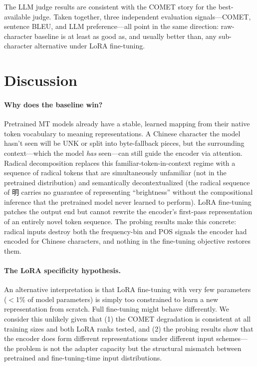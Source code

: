 \documentclass[11pt]{article}
\begin{document}
The LLM judge results are consistent with the COMET story for the best-available judge. Taken together, three independent evaluation signals---COMET, sentence BLEU, and LLM preference---all point in the same direction: raw-character baseline is at least as good as, and usually better than, any sub-character alternative under LoRA fine-tuning.

\section{Discussion}
\label{sec:discussion}

\paragraph{Why does the baseline win?}
Pretrained MT models already have a stable, learned mapping from their native token vocabulary to meaning representations. A Chinese character the model hasn't seen will be UNK or split into byte-fallback pieces, but the surrounding context---which the model \textit{has} seen---can still guide the encoder via attention. Radical decomposition replaces this familiar-token-in-context regime with a sequence of radical tokens that are simultaneously unfamiliar (not in the pretrained distribution) and semantically decontextualized (the radical sequence of 明 carries no guarantee of representing ``brightness'' without the compositional inference that the pretrained model never learned to perform). LoRA fine-tuning patches the output end but cannot rewrite the encoder's first-pass representation of an entirely novel token sequence. The probing results make this concrete: radical inputs destroy both the frequency-bin and POS signals the encoder had encoded for Chinese characters, and nothing in the fine-tuning objective restores them.

\paragraph{The LoRA specificity hypothesis.}
An alternative interpretation is that LoRA fine-tuning with very few parameters ($<$1\% of model parameters) is simply too constrained to learn a new representation from scratch. Full fine-tuning might behave differently. We consider this unlikely given that (1) the COMET degradation is consistent at all training sizes and both LoRA ranks tested, and (2) the probing results show that the encoder does form different representations under different input schemes---the problem is not the adapter capacity but the structural mismatch between pretrained and fine-tuning-time input distributions.
\end{document}
